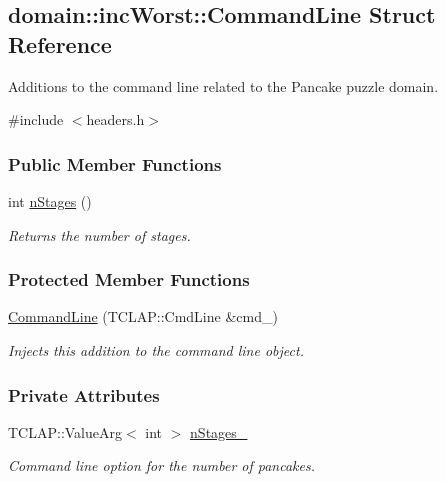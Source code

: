 \hypertarget{structdomain_1_1incWorst_1_1CommandLine}{}\subsection{domain\+:\+:inc\+Worst\+:\+:Command\+Line Struct Reference}
\label{structdomain_1_1incWorst_1_1CommandLine}


Additions to the command line related to the Pancake puzzle domain.  




{\ttfamily \#include $<$headers.\+h$>$}

\subsubsection*{Public Member Functions}
\begin{DoxyCompactItemize}
\item 
int \hyperlink{structdomain_1_1incWorst_1_1CommandLine_a29e5294e872ab59954da6d04a7e233ad}{n\+Stages} ()
\begin{DoxyCompactList}\small\item\em Returns the number of stages. \end{DoxyCompactList}\end{DoxyCompactItemize}
\subsubsection*{Protected Member Functions}
\begin{DoxyCompactItemize}
\item 
\hyperlink{structdomain_1_1incWorst_1_1CommandLine_ae4ab991b3ba60f85ef3b5e73d406ae48}{Command\+Line} (T\+C\+L\+A\+P\+::\+Cmd\+Line \&cmd\+\_\+)
\begin{DoxyCompactList}\small\item\em Injects this addition to the command line object. \end{DoxyCompactList}\end{DoxyCompactItemize}
\subsubsection*{Private Attributes}
\begin{DoxyCompactItemize}
\item 
T\+C\+L\+A\+P\+::\+Value\+Arg$<$ int $>$ \hyperlink{structdomain_1_1incWorst_1_1CommandLine_a204495fd02902f7241e78fc35c6ec352}{n\+Stages\+\_\+}\hypertarget{structdomain_1_1incWorst_1_1CommandLine_a204495fd02902f7241e78fc35c6ec352}{}\label{structdomain_1_1incWorst_1_1CommandLine_a204495fd02902f7241e78fc35c6ec352}

\begin{DoxyCompactList}\small\item\em Command line option for the number of pancakes. \end{DoxyCompactList}\end{DoxyCompactItemize}


